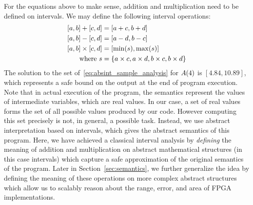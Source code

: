 For the equations above to make sense, addition and multiplication need to be
defined on intervals. We may define the following interval operations:
\begin{equation}
    \begin{aligned}
        \left[{a}, {b}\right] + \left[{c}, {d}\right] &= \left[{a + c}, {b + d}\right] \\
        \left[{a}, {b}\right] - \left[{c}, {d}\right] &=  \left[{a - d}, {b - c}\right] \\
        \left[{a}, {b}\right] \times \left[{c}, {d}\right] &=
            \left[{\min(s)}, {\max(s)}\right] \\
        \text{where~} s &= \{ a \times c, a \times d, b \times c, b \times d \}
    \end{aligned}
    \label{eq:interval_operations}
\end{equation}
The solution to the set of~\eqref{eq:absint_sample_analysis} for $A({4})$
is $[4.84, 10.89]$, which represents a safe bound on the output at the end of
program execution. Note that in actual execution of the program, the semantics
represent the values of intermediate variables, which are real values. In our
case, a set of real values forms the set of all possible values produced by
our code. However computing this set precisely is not, in general, a possible
task. Instead, we use abstract interpretation based on intervals, which gives
the abstract semantics of this program. Here, we have achieved a classical
interval analysis by \emph{defining} the meaning of addition and multiplication
on abstract mathematical structures (in this case intervals) which capture
a safe approximation of the original semantics of the program. Later in
Section~\ref{sec:semantics}, we further generalize the idea by defining the
meaning of these operations on more complex abstract structures which allow us
to scalably reason about the range, error, and area of FPGA implementations.
